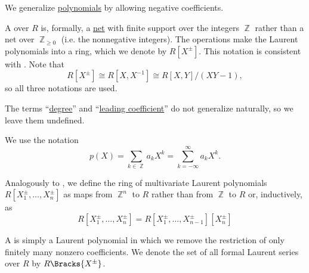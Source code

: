 \begin{definition}\label{def:laurent_polynomial}
  We generalize \hyperref[def:polynomial]{polynomials} by allowing negative coefficients.

  \begin{thmenum}
     A  over \( R \) is, formally, a \hyperref[def:topological_net]{net} with finite support over the integers \( \BbbZ \) rather than a net over \( \BbbZ_{\geq 0} \) (i.e. the nonnegative integers). The operations  make the Laurent polynomials into a ring, which we denote by \( R[X^\pm] \). This notation is consistent with . Note that
    \begin{equation*}
      R[X^\pm] \cong R[X, X^{-1}] \cong R[X, Y] / (XY - 1),
    \end{equation*}
    so all three notations are used.

    The terms \enquote{\hyperref[def:polynomial/degree]{degree}} and \enquote{\hyperref[def:polynomial/leading_coefficient]{leading coefficient}} do not generalize naturally, so we leave them undefined.

    We use the notation
    \begin{equation*}
      p(X) = \sum_{k \in \BbbZ} a_k X^k = \sum_{k=-\infty}^\infty a_k X^k.
    \end{equation*}

     Analogously to , we define the ring of multivariate Laurent polynomials \( R[X_1^\pm, \ldots, X_n^\pm] \) as maps from \( \BbbZ^n \) to \( R \) rather than from \( \BbbZ \) to \( R \) or, inductively, as
    \begin{equation*}
      R[X_1^\pm, \ldots, X_n^\pm] = R[X_1^\pm, \ldots, X_{n-1}^\pm][X_n^\pm]
    \end{equation*}

     A  is simply a Laurent polynomial in which we remove the restriction of only finitely many nonzero coefficients. We denote the set of all formal Laurent series over \( R \) by \( R\Bracks{X^\pm} \).
  \end{thmenum}
\end{definition}
